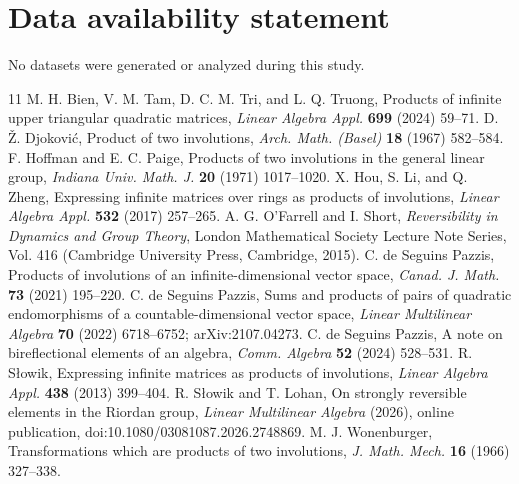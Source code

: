 \documentclass[11pt,reqno,a4paper]{amsart}
\numberwithin{equation}{section}
\theoremstyle{definition}
\theoremstyle{plain}
\begin{document}
\section*{Data availability statement}
No datasets were generated or analyzed during this study.

\begin{thebibliography}{11}
 M. H. Bien, V. M. Tam, D. C. M. Tri, and L. Q. Truong, Products of infinite upper triangular quadratic matrices, \emph{Linear Algebra Appl.} \textbf{699} (2024) 59--71.
 D. \v{Z}. Djokovi\'{c}, Product of two involutions, \emph{Arch. Math. (Basel)} \textbf{18} (1967) 582--584.
 F. Hoffman and E. C. Paige, Products of two involutions in the general linear group, \emph{Indiana Univ. Math. J.} \textbf{20} (1971) 1017--1020.
 X. Hou, S. Li, and Q. Zheng, Expressing infinite matrices over rings as products of involutions, \emph{Linear Algebra Appl.} \textbf{532} (2017) 257--265.
 A. G. O'Farrell and I. Short, \emph{Reversibility in Dynamics and Group Theory}, London Mathematical Society Lecture Note Series, Vol. 416 (Cambridge University Press, Cambridge, 2015).
 C. de Seguins Pazzis, Products of involutions of an infinite-dimensional vector space, \emph{Canad. J. Math.} \textbf{73} (2021) 195--220.
 C. de Seguins Pazzis, Sums and products of pairs of quadratic endomorphisms of a countable-dimensional vector space, \emph{Linear Multilinear Algebra} \textbf{70} (2022) 6718--6752; arXiv:2107.04273.
 C. de Seguins Pazzis, A note on bireflectional elements of an algebra, \emph{Comm. Algebra} \textbf{52} (2024) 528--531.
 R. S\l{}owik, Expressing infinite matrices as products of involutions, \emph{Linear Algebra Appl.} \textbf{438} (2013) 399--404.
 R. S\l{}owik and T. Lohan, On strongly reversible elements in the Riordan group, \emph{Linear Multilinear Algebra} (2026), online publication, doi:10.1080/03081087.2026.2748869.
 M. J. Wonenburger, Transformations which are products of two involutions, \emph{J. Math. Mech.} \textbf{16} (1966) 327--338.
\end{thebibliography}
\end{document}

